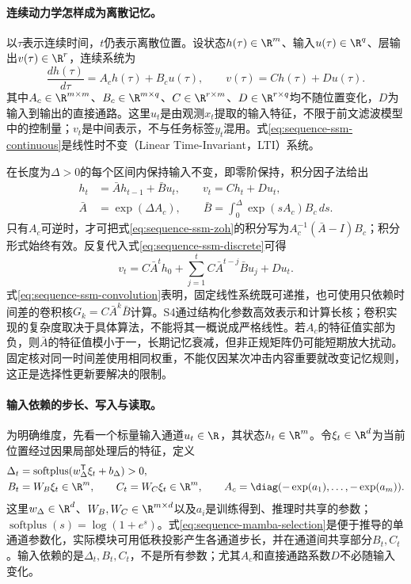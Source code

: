 \paragraph{连续动力学怎样成为离散记忆。}
以$\tau$表示连续时间，$t$仍表示离散位置。设状态$h(\tau)\in\R^m$、输入$u(\tau)\in\R^q$、层输出$v(\tau)\in\R^r$，连续系统为
\begin{equation}
 \frac{d h(\tau)}{d\tau}=A_c h(\tau)+B_c u(\tau),\qquad
 v(\tau)=Ch(\tau)+Du(\tau).
 \label{eq:sequence-ssm-continuous}
\end{equation}
其中$A_c\in\R^{m\times m}$、$B_c\in\R^{m\times q}$、$C\in\R^{r\times m}$、$D\in\R^{r\times q}$均不随位置变化，$D$为输入到输出的直接通路。这里$u_t$是由观测$x_t$提取的输入特征，不限于前文滤波模型中的控制量；$v_t$是中间表示，不与任务标签$y_t$混用。式\eqref{eq:sequence-ssm-continuous}是线性时不变（Linear Time-Invariant，LTI）系统。

在长度为$\Delta>0$的每个区间内保持输入不变，即零阶保持，积分因子法给出
\begin{align}
 h_t&=\bar A h_{t-1}+\bar B u_t,\qquad v_t=Ch_t+Du_t,
 \label{eq:sequence-ssm-discrete}\\
 \bar A&=\exp(\Delta A_c),\qquad
 \bar B=\int_0^\Delta\exp(sA_c)B_c\,ds.
 \label{eq:sequence-ssm-zoh}
\end{align}
只有$A_c$可逆时，才可把式\eqref{eq:sequence-ssm-zoh}的积分写为$A_c^{-1}(\bar A-I)B_c$；积分形式始终有效。反复代入式\eqref{eq:sequence-ssm-discrete}可得
\begin{equation}
 v_t=C\bar A^t h_0+\sum_{j=1}^t C\bar A^{t-j}\bar B u_j+Du_t.
 \label{eq:sequence-ssm-convolution}
\end{equation}
式\eqref{eq:sequence-ssm-convolution}表明，固定线性系统既可递推，也可使用只依赖时间差的卷积核$G_k=C\bar A^k\bar B$计算。S4通过结构化参数高效表示和计算长核；卷积实现的复杂度取决于具体算法，不能将其一概说成严格线性。若$A_c$的特征值实部为负，则$\bar A$的特征值模小于一，长期记忆衰减，但非正规矩阵仍可能短期放大扰动。固定核对同一时间差使用相同权重，不能仅因某次冲击内容重要就改变记忆规则，这正是选择性更新要解决的限制。

\paragraph{输入依赖的步长、写入与读取。}
为明确维度，先看一个标量输入通道$u_t\in\R$，其状态$h_t\in\R^m$。令$\xi_t\in\R^d$为当前位置经过因果局部处理后的特征，定义
\begin{align}
 \Delta_t&=\operatorname{softplus}(w_\Delta^{\mathsf T}\xi_t+b_\Delta)>0,
 \label{eq:sequence-mamba-selection}\\
 B_t&=W_B\xi_t\in\R^m,\qquad C_t=W_C\xi_t\in\R^m,\qquad
 A_c=\diag(-\exp(a_1),\ldots,-\exp(a_m)).\nonumber
\end{align}
这里$w_\Delta\in\R^d$、$W_B,W_C\in\R^{m\times d}$以及$a_i$是训练得到、推理时共享的参数；$\operatorname{softplus}(s)=\log(1+e^s)$。式\eqref{eq:sequence-mamba-selection}是便于推导的单通道参数化，实际模块可用低秩投影产生各通道步长，并在通道间共享部分$B_t,C_t$。输入依赖的是$\Delta_t,B_t,C_t$，不是所有参数；尤其$A_c$和直接通路系数$D$不必随输入变化。

